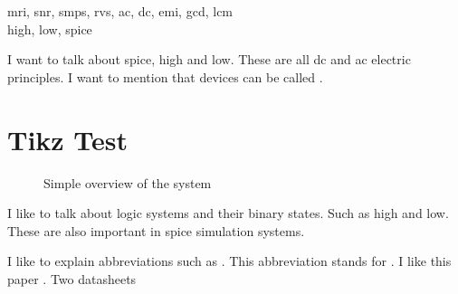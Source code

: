 \gls{mri}, \gls{snr}, \gls{smps}, \gls{rvs}, \gls{ac}, \gls{dc}, \gls{emi}, \gls{gcd}, \gls{lcm} \\
\gls{high}, \gls{low}, \gls{spice}


I want to talk about \gls{spice}, \gls{high} and \gls{low}. These are all \gls{dc} and \gls{ac} electric principles. I want to mention that  devices can be called .

\section{Tikz Test}
\begin{figure}[h]
	\centering 
	\resizebox{\textwidth}{!}{
		
	}
	\caption{Simple overview of the system}
	\label{fig:system_overview}
\end{figure}

I like to talk about logic systems and their binary states. Such as \gls{high} and \gls{low}. These are also important in \gls{spice} simulation systems.

I like to explain abbreviations such as . This abbreviation stands for . I like this paper \cite{Omura2022}.
Two datasheets \cite{AD8332,AD8333}